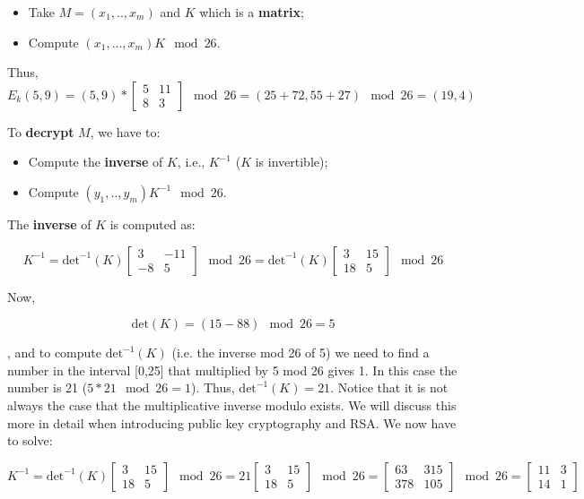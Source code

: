 \begin{itemize}
    \item Take $M = (x_1, .., x_m)$ and $K$ which is a \textbf{matrix};
    \item Compute $(x_1,...,x_m) K \mod 26$.
\end{itemize}

Thus, $E_k (5,9) = (5,9) * \begin{bmatrix}
5 & 11 \\
8 & 3 
\end{bmatrix} \mod 26 = (25 + 72, 55 + 27) \mod 26 = (19,4)$

To \textbf{decrypt} $M$, we have to:

\begin{itemize}
    \item Compute the \textbf{inverse} of $K$, i.e., $K^{-1}$ ($K$ is invertible);
    \item Compute $(y_1, .., y_m) K^{-1} \mod 26$.
\end{itemize}

The \textbf{inverse} of $K$ is computed as:

$$
K^{-1} = \text{det}^{-1}(K) \begin{bmatrix}
3 & -11 \\
-8 & 5 
\end{bmatrix} \mod 26 = \text{det}^{-1} (K) \begin{bmatrix}
3 & 15 \\
18 & 5 
\end{bmatrix} \mod 26
$$

Now,

$$
\text{det}(K) = (15 - 88) \mod 26 = 5
$$

, and to compute $\text{det}^{-1} (K)$ (i.e. the inverse mod 26 of 5) we need to find a number in the interval [0,25] that multiplied by 5 mod 26 gives 1. In this case the number is 21 ($5 * 21 \mod 26 = 1$). Thus, $\text{det}^{-1} (K) = 21$. Notice that it is not always the case that the multiplicative inverse modulo exists. We will discuss this more in detail when introducing public key cryptography and RSA. We now have to solve:

$$
K^{-1} = \text{det}^{-1} (K) \begin{bmatrix}
3 & 15 \\
18 & 5 
\end{bmatrix} \mod 26 = 21 \begin{bmatrix}
3 & 15 \\
18 & 5 
\end{bmatrix} \mod 26 = \begin{bmatrix}
63 & 315 \\
378 & 105 
\end{bmatrix} \mod 26 = \begin{bmatrix}
11 & 3 \\
14 & 1 
\end{bmatrix}
$$

